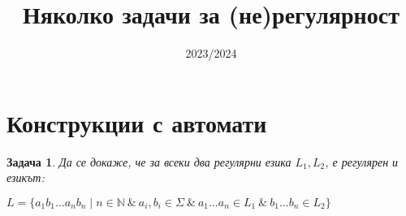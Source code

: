 \documentclass{article}
\newtheorem{problem}{Задача}[section]
\theoremstyle{definition}
\begin{document}
\title{Няколко задачи за (не)регулярност}
\date{2023/2024}

\maketitle

\section{Конструкции с автомати}

\begin{problem}
Да се докаже, че за всеки два регулярни езика $L_1, L_2$, е регулярен и езикът:
\begin{center}
    $L = \{ a_1 b_1 \dots a_n b_n \mid n \in \mathbb{N} \: \& \: a_i, b_i \in \Sigma \: \& \: a_1 \dots a_n \in L_1 \: \& \: b_1 \dots b_n \in L_2 \}$
\end{center}
\end{problem}
\end{document}
